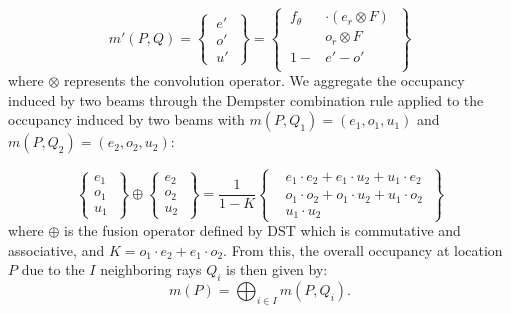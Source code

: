 \begin{equation}
 m'(P,Q)=\left\{\  \begin{aligned}
                 e'\\o'\\u'
                 \end{aligned}
\  \right\} = \left\{\  \begin{aligned}
                     f_\theta  &\cdot (e_r \otimes F)\\
                     &o_r \otimes F\\
                     1 - &e' - o'\\ 
                    \end{aligned}
\ \right\}
\end{equation}
where $\otimes$ represents the convolution operator.
We  aggregate the occupancy induced by two beams through the Dempster combination rule applied to the occupancy induced by two beams with $m(P,Q_1)=(e_1, o_1, u_1)$ and $m(P,Q_2)=(e_2, o_2, u_2)$:

\begin{equation}
  \left\{ \begin{aligned}
                 e_1\  \\o_1\  \\u_1\ 
                \end{aligned}
 \right\} \oplus \left\{ \begin{aligned}
                     e_2\ \\o_2\ \\u_2\  
                    \end{aligned}
\right\} = \frac{1}{1-K} 
\left\{ 
  \begin{aligned}
     &e_1\cdot e_2 + e_1\cdot u_2 + u_1\cdot e_2 \ \\
     &o_1\cdot o_2 + o_1\cdot u_2 + u_1\cdot o_2 \ \\
     &u_1\cdot u_2 \ 
  \end{aligned}
 \right\}
\end{equation}
where $\oplus$ is the fusion operator defined by DST which is commutative and associative, and $K = o_1\cdot e_2 + e_1\cdot o_2$.
From this, the overall occupancy at location $P$ due to the $I$ neighboring rays $Q_i$ is then given by:
\begin{equation}
 m(P) = \bigoplus_{i\in I} m(P,Q_i).
\end{equation}

